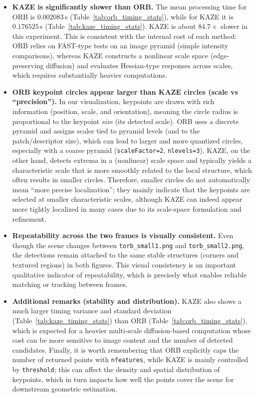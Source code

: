 \begin{itemize}
    \item \textbf{KAZE is significantly slower than ORB.}
    The mean processing time for ORB is $0.002083\,$s (Table~\ref{tab:orb_timing_stats}), while for KAZE 
    it is $0.176525\,$s (Table~\ref{tab:kaze_timing_stats}). KAZE is about $84.7\times$ slower in this experiment.
    This is consistent with the internal cost of each method: ORB relies on FAST-type tests on an image pyramid (simple intensity comparisons), whereas KAZE constructs a nonlinear scale space (edge-preserving diffusion) and evaluates Hessian-type responses across scales, which requires substantially heavier computations.

    \item \textbf{ORB keypoint circles appear larger than KAZE circles (scale vs ``precision'').}
    In our visualization, keypoints are drawn with rich information (position, scale, and orientation), meaning the circle radius is proportional to the keypoint \emph{size} (its detected scale).
    ORB uses a discrete pyramid and assigns scales tied to pyramid levels (and to the patch/descriptor size), which can lead to larger and more quantized circles, especially with a coarse pyramid (\texttt{scaleFactor=2}, \texttt{nlevels=3}).
    KAZE, on the other hand, detects extrema in a (nonlinear) scale space and typically yields a characteristic scale that is more smoothly related to the local structure, which often results in smaller circles.
    Therefore, smaller circles do not automatically mean ``more precise localization''; they mainly indicate that the keypoints are selected at smaller characteristic scales, although KAZE can indeed appear more tightly localized in many cases due to its scale-space formulation and refinement.

    \item \textbf{Repeatability across the two frames is visually consistent.}
    Even though the scene changes between \texttt{torb\_small1.png} and \texttt{torb\_small2.png}, the detections remain attached to the same stable structures (corners and textured regions) in both figures.
    This visual consistency is an important qualitative indicator of repeatability, which is precisely what enables reliable matching or tracking between frames.

    \item \textbf{Additional remarks (stability and distribution).}
    KAZE also shows a much larger timing variance and standard deviation (Table~\ref{tab:kaze_timing_stats}) than ORB (Table~\ref{tab:orb_timing_stats}), which is expected for a heavier multi-scale diffusion-based computation whose cost can be more sensitive to image content and the number of detected candidates.
    Finally, it is worth remembering that ORB explicitly caps the number of returned points with \texttt{nfeatures}, while KAZE is mainly controlled by \texttt{threshold}; this can affect the density and spatial distribution of keypoints, which in turn impacts how well the points cover the scene for downstream geometric estimation.
\end{itemize}
